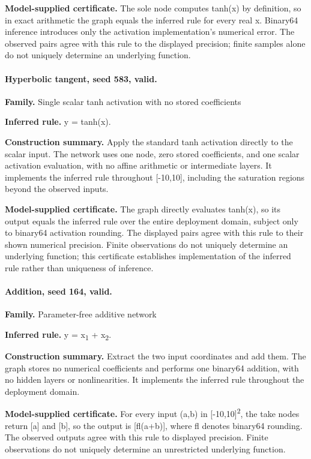 \textbf{Model-supplied certificate.} The sole node computes tanh(x) by definition, so in exact arithmetic the graph equals the inferred rule for every real x. Binary64 inference introduces only the activation implementation's numerical error. The observed pairs agree with this rule to the displayed precision; finite samples alone do not uniquely determine an underlying function.


\paragraph{Hyperbolic tangent, seed 583, valid.}

\textbf{Family.} Single scalar tanh activation with no stored coefficients


\textbf{Inferred rule.} y = tanh(x).


\textbf{Construction summary.} Apply the standard tanh activation directly to the scalar input. The network uses one node, zero stored coefficients, and one scalar activation evaluation, with no affine arithmetic or intermediate layers. It implements the inferred rule throughout [-10,10], including the saturation regions beyond the observed inputs.


\textbf{Model-supplied certificate.} The graph directly evaluates tanh(x), so its output equals the inferred rule over the entire deployment domain, subject only to binary64 activation rounding. The displayed pairs agree with this rule to their shown numerical precision. Finite observations do not uniquely determine an underlying function; this certificate establishes implementation of the inferred rule rather than uniqueness of inference.


\paragraph{Addition, seed 164, valid.}

\textbf{Family.} Parameter-free additive network


\textbf{Inferred rule.} y = x\textsubscript{1} + x\textsubscript{2}.


\textbf{Construction summary.} Extract the two input coordinates and add them. The graph stores no numerical coefficients and performs one binary64 addition, with no hidden layers or nonlinearities. It implements the inferred rule throughout the deployment domain.


\textbf{Model-supplied certificate.} For every input (a,b) in [-10,10]\textsuperscript{2}, the take nodes return [a] and [b], so the output is [fl(a+b)], where fl denotes binary64 rounding. The observed outputs agree with this rule to displayed precision. Finite observations do not uniquely determine an unrestricted underlying function.


